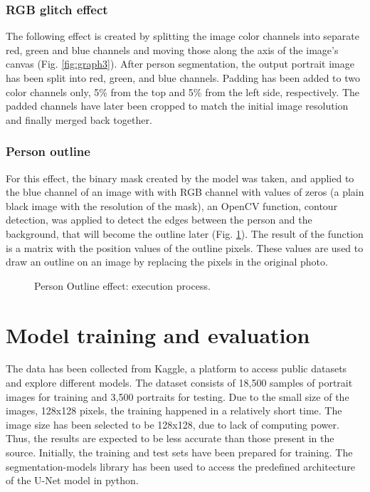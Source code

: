 \documentclass[english]{sbrt}
\begin{document}
\subsubsection{RGB glitch effect}
The following effect is created by splitting the image color channels into separate red, green and blue channels and moving those along the axis of the image's canvas (Fig. \ref{fig:graph3}). After person segmentation, the output portrait image has been split into red, green, and blue channels. Padding has been added to two color channels only, 5\% from the top and 5\% from the left side, respectively. The padded channels have later been cropped to match the initial image resolution and finally merged back together.

\subsubsection{Person outline}
For this effect, the binary mask created by the model was taken, and applied to the blue channel of an image with with RGB channel with values of zeros (a plain black image with the resolution of the mask), an OpenCV function, contour detection, was applied to detect the edges between the person and the background, that will become the outline later (Fig. \ref{fig:graph4}). The result of the function is a matrix with the position values of the outline pixels. These values are used to draw an outline on an image by replacing the pixels in the original photo.

\begin{figure}[hbt]
\centering 
{}
\caption{\label{fig:graph4} Person Outline effect: execution process.}
\end{figure}

\section{Model training and evaluation}
The data has been collected from Kaggle, a platform to access public datasets and explore different models. The dataset consists of 18,500 samples of portrait images for training and 3,500 portraits for testing. Due to the small size of the images, 128x128 pixels, the training happened in a relatively short time. The image size has been selected to be 128x128, due to lack of computing power. Thus, the results are expected to be less accurate than those present in the source. 
Initially, the training and test sets have been prepared for training. The segmentation-models library has been used to access the predefined architecture of the U-Net model in python. 
\end{document}
